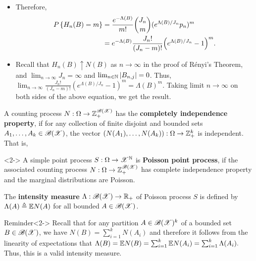 \documentclass[12pt,aspectratio=169]{beamer}
\begin{document}
\begin{frame}
\begin{Proof}
\begin{itemize}
\item Therefore, 
\begin{align*}
P\left\{H_n(B) = m\right\} 
&= \frac{e^{-\Lambda(B)}}{m!}\binom{J_n}{m}(e^{\Lambda(B)/J_n}p_n)^m \\
&= e^{-\Lambda(B)}\frac{J_n!}{(J_n-m)!}\Big(e^{\Lambda(B)/J_n}-1\Big)^m.
\end{align*}
\item <2-> Recall that $H_n(B) \uparrow N(B)$ as $n\to\infty$ in the proof of R\'{e}nyi's Theorem, 
and $\lim_{n\to\infty}J_n = \infty$ and $\lim_{n\in\mathbb{N}}\left\lvert B_{n,j}\right\rvert= 0$. 
Thus, $\lim_{n\to\infty}\frac{J_n!}{(J_n-m)!}(e^{\Lambda(B)/J_n}-1)^m = \Lambda(B)^m$.
Taking limit $n\to\infty$ on both sides of the above equation, we get the result. 
\end{itemize}
\end{Proof}
\end{frame}

\begin{frame}
\begin{Definition} 
A counting process $N:\Omega\to\mathbb{Z}_+^{\mathscr{B}(\mathscr{X})}$ has the \textbf{completely independence property},  
if for any collection of finite disjoint and bounded sets $A_1, \dots, A_k \in \mathscr{B}(\mathscr{X})$, 
the vector $(N(A_1), \dots, N(A_k)):\Omega \to \mathbb{Z}_+^k$ is independent. 
That is,
\end{Definition}

\begin{Definition}<2->
A simple point process $S: \Omega \to \mathscr{X}^{\mathbb{N}}$ is \textbf{Poisson point process}, 
if the associated counting process $N: \Omega \to \mathbb{Z}_+^{\mathscr{B}(\mathscr{X})}$ has complete independence property and the marginal distributions are Poisson. 
\end{Definition}
\end{frame}


\begin{frame}
\begin{Definition}
The \textbf{intensity measure} $\Lambda: \mathscr{B}(\mathscr{X}) \to \mathbb{R}_+$ of Poisson process $S$ is defined by $\Lambda(A) \triangleq \mathbb{E} N(A)$ for all bounded $A \in \mathscr{B}(\mathscr{X})$. 
\end{Definition}

\begin{block}{Reminder}<2->
Recall that for any partition $A \in \mathscr{B}(\mathscr{X})^k$ of a bounded set $B \in \mathscr{B}(\mathscr{X})$, we have $N(B) = \sum_{i=1}^kN(A_i)$ and therefore it follows from the linearity of expectations that $\Lambda(B) = \mathbb{E} N(B) = \sum_{i=1}^k\mathbb{E} N(A_i) = \sum_{i=1}^k\Lambda(A_i).$ 
Thus, this is a valid intensity measure. 
\end{block}
\end{frame}
\end{document}

